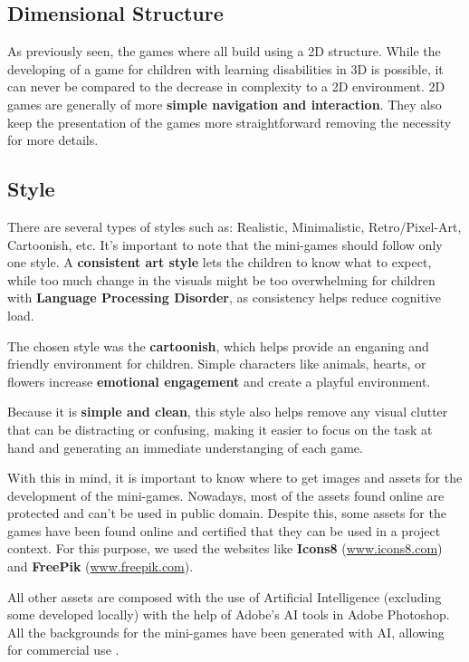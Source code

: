 \subsection*{Dimensional Structure}
As previously seen, the games where all build using a 2D structure. While the developing of a game for children with learning disabilities in 3D is possible, it can never be compared to the decrease in complexity to a 2D environment. 2D games are generally of more \textbf{simple navigation and interaction}. They also keep the presentation of the games more straightforward removing the necessity for more details.

\subsection*{Style}
There are several types of styles such as: Realistic, Minimalistic, Retro/Pixel-Art, Cartoonish, etc.
It's important to note that the mini-games should follow only one style. A \textbf{consistent art style} lets the children to know what to expect, while too much change in the visuals might be too overwhelming for children with \textbf{Language Processing Disorder}, as consistency helps reduce cognitive load.

The chosen style was the \textbf{cartoonish}, which helps provide an enganing and friendly environment for children. Simple characters like animals, hearts, or flowers increase \textbf{emotional engagement} and create a playful environment.

Because it is \textbf{simple and clean}, this style also helps remove any visual clutter that can be distracting or confusing, making it easier to focus on the task at hand and generating an immediate understanging of each game.

With this in mind, it is important to know where to get images and assets for the development of the mini-games. Nowadays, most of the assets found online are protected and can't be used in public domain. Despite this, some assets for the games have been found online and certified that they can be used in a project context. For this purpose, we used the websites like \textbf{Icons8} (\url{www.icons8.com}) and \textbf{FreePik} (\url{www.freepik.com}).

All other assets are composed with the use of Artificial Intelligence (excluding some developed locally) with the help of Adobe's AI tools in Adobe Photoshop. All the backgrounds for the mini-games have been generated with AI, allowing for commercial use \cite{adobeGuidelines}.

